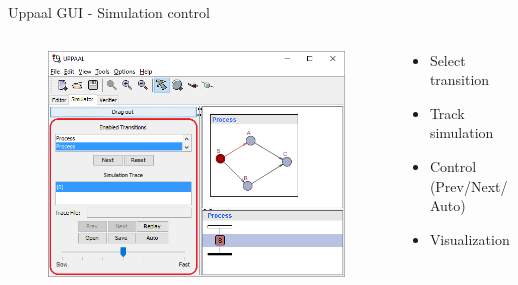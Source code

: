 \documentclass{beamer}
\begin{document}
\begin{frame}{Uppaal GUI - Simulation control}
	\vspace{-5mm}
	\begin{columns}
		\begin{column}{0.8\textwidth}
			\begin{figure}[H]
				\includegraphics[scale=0.55]{img/uppaal_gui_small_simulation.png}
			\end{figure}
		\end{column}
		
		\begin{column}{0.35\textwidth}
			\begin{itemize}
				\item Select transition
				\item Track simulation
				\item Control (Prev/Next/Auto)
				\item Visualization
			\end{itemize}
		\end{column}
	\end{columns}		
\end{frame}
\end{document}
